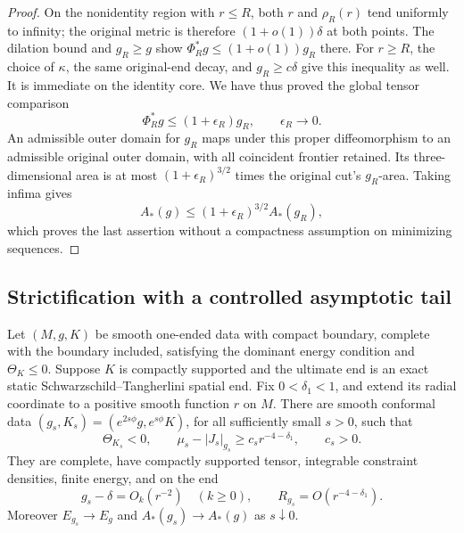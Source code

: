 \begin{proof}
On the nonidentity region with \(r\le R\), both \(r\) and
\(\rho_R(r)\) tend uniformly to infinity; the original metric is
therefore \((1+o(1))\delta\) at both points. The dilation bound and
\(g_R\ge g\) show
\(\Phi_R^*g\le(1+o(1))g_R\) there. For \(r\ge R\), the choice
of \(\kappa\), the same original-end decay, and \(g_R\ge c\delta\)
give this inequality as well. It is immediate on the identity core.
We have thus proved the global tensor comparison
\begin{equation}\label{four:end:compression-metric}
 \Phi_R^*g\le(1+\epsilon_R)g_R,\qquad\epsilon_R\longrightarrow0.
\end{equation}
An admissible outer domain for \(g_R\) maps under this proper
diffeomorphism to an admissible original outer domain, with all
coincident frontier retained. Its three-dimensional area is at most
\((1+\epsilon_R)^{3/2}\) times the original cut's \(g_R\)-area.
Taking infima gives
\[
 A_*(g)\le(1+\epsilon_R)^{3/2}A_*(g_R),
\]
which proves the last assertion without a compactness assumption on
minimizing sequences.
\end{proof}

\subsection{Strictification with a controlled asymptotic tail}

\begin{lemma}[Strictification]\label{four:lem:strictification}
Let \((M,g,K)\) be smooth one-ended data with compact boundary,
complete with the boundary included, satisfying the dominant energy
condition and \(\Theta_K\le0\). Suppose \(K\) is compactly supported
and the ultimate end is an exact static Schwarzschild--Tangherlini
spatial end. Fix \(0<\delta_1<1\), and extend its radial coordinate to
a positive smooth function \(r\) on \(M\).
There are smooth conformal data
\((g_s,K_s)=(e^{2s\phi}g,e^{s\phi}K)\), for all sufficiently small
\(s>0\), such that
\begin{equation}\label{four:end:strict-data}
 \Theta_{K_s}<0,\qquad
 \mu_s-|J_s|_{g_s}\ge c_s r^{-4-\delta_1},\qquad c_s>0.
\end{equation}
They are complete, have compactly supported tensor, integrable constraint
densities, finite energy, and on the end
\begin{equation}\label{four:end:strict-decay}
 g_s-\delta=O_k(r^{-2})\quad(k\ge0),\qquad
 R_{g_s}=O(r^{-4-\delta_1}).
\end{equation}
Moreover \(E_{g_s}\to E_g\) and \(A_*(g_s)\to A_*(g)\) as
\(s\downarrow0\).
\end{lemma}

